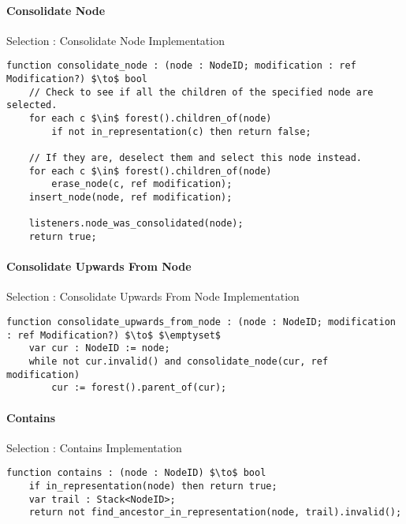 \paragraph{Consolidate Node}

\begin{stulisting}[H]
\caption{Selection : Consolidate Node Implementation}
\begin{lstlisting}[style=Default]
function consolidate_node : (node : NodeID; modification : ref Modification?) $\to$ bool
	// Check to see if all the children of the specified node are selected.
	for each c $\in$ forest().children_of(node)
		if not in_representation(c) then return false;

	// If they are, deselect them and select this node instead.
	for each c $\in$ forest().children_of(node)
		erase_node(c, ref modification);
	insert_node(node, ref modification);

	listeners.node_was_consolidated(node);
	return true;
\end{lstlisting}
\end{stulisting}

\paragraph{Consolidate Upwards From Node}

\begin{stulisting}[H]
\caption{Selection : Consolidate Upwards From Node Implementation}
\begin{lstlisting}[style=Default]
function consolidate_upwards_from_node : (node : NodeID; modification : ref Modification?) $\to$ $\emptyset$
	var cur : NodeID := node;
	while not cur.invalid() and consolidate_node(cur, ref modification)
		cur := forest().parent_of(cur);
\end{lstlisting}
\end{stulisting}

\paragraph{Contains}

\begin{stulisting}[H]
\caption{Selection : Contains Implementation}
\begin{lstlisting}[style=Default]
function contains : (node : NodeID) $\to$ bool
	if in_representation(node) then return true;
	var trail : Stack<NodeID>;
	return not find_ancestor_in_representation(node, trail).invalid();
\end{lstlisting}
\end{stulisting}

